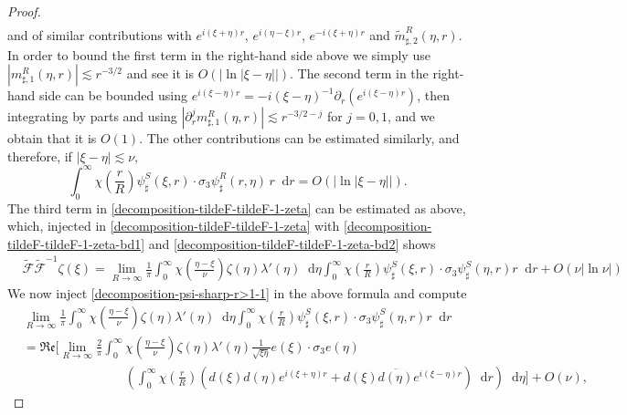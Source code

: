 \documentclass[11 pt]{amsart}
\theoremstyle{definition}
\theoremstyle{remark}
\numberwithin{equation}{section}
\newcommand{\dd}{\mathop{}\!\mathrm{d}}
\begin{document}
\begin{proof}
\begin{align*}
\end{align*}
and of similar contributions with $e^{i(\xi+\eta)r}$, $ e^{i(\eta-\xi)r}$, $e^{-i(\xi+\eta)r}$ and $\widetilde m_{\sharp,2}^R(\eta,r)$. In order to bound the first term in the right-hand side above we simply use $|m_{\sharp,1}^R(\eta,r)|\lesssim r^{-3/2}$ and see it is $O(|\ln |\xi-\eta||)$. The second term in the right-hand side can be bounded using $e^{i(\xi-\eta)r}=-i(\xi-\eta)^{-1}\partial_r (e^{i(\xi-\eta)r})$, then integrating by parts and using $|\partial_r^j m_{\sharp,1}^R(\eta,r)|\lesssim r^{-3/2-j}$ for $j=0,1$, and we obtain that it is $O(1)$. The other contributions can be estimated similarly, and therefore, if $|\xi-\eta|\lesssim \nu$,
\begin{equation} \label{decomposition-tildeF-tildeF-1-zeta-bd2} 
\int_0^\infty \chi \left( \frac{r}{R} \right)  \psi_\sharp^S(\xi,r) \cdot \sigma_3  \psi_\sharp^R(r,\eta)  \,r \dd r =O(|\ln |\xi-\eta||) .
\end{equation}
The third term in \eqref{decomposition-tildeF-tildeF-1-zeta} can be estimated as above, which, injected in \eqref{decomposition-tildeF-tildeF-1-zeta} with \eqref{decomposition-tildeF-tildeF-1-zeta-bd1} and \eqref{decomposition-tildeF-tildeF-1-zeta-bd2} shows
\begin{align} \label{bound-tildeF-tildeF-1-inter1} 
 &\widetilde{\mathcal F} \widetilde{\mathcal F}^{-1} \zeta (\xi)
= \lim_{R \to \infty} \frac{1}{\pi} \int_{0}^\infty \chi (\frac{\eta-\xi}{\nu}) \zeta(\eta)  \lambda'(\eta) \dd \eta \int_0^\infty \chi \left( \frac{r}{R} \right) \psi_\sharp^S (\xi,r) \cdot \sigma_3  \psi_\sharp^S(\eta ,r) r\dd r+O(\nu|\ln \nu|)
\end{align}
We now inject \eqref{decomposition-psi-sharp-r>1-1} in the above formula and compute
\begin{align}  \label{bound-tildeF-tildeF-1-inter2} 
& \lim_{R \to \infty} \frac{1}{\pi} \int_{0}^\infty \chi (\frac{\eta-\xi}{\nu}) \zeta(\eta)  \lambda'(\eta)  \dd \eta \int_0^\infty \chi \left( \frac{r}{R} \right) \psi_\sharp^S (\xi,r) \cdot \sigma_3  \psi_\sharp^S(\eta ,r) r\dd r \\
\nonumber &= \mathfrak{Re} \Bigg[ \lim_{R \to \infty} \frac{2}{\pi} \int_{0}^\infty \chi (\frac{\eta-\xi}{\nu}) \zeta(\eta)  \lambda'(\eta) \frac{1}{\sqrt{\xi \eta}} e(\xi)\cdot \sigma_3 e(\eta) \\
\nonumber & \qquad \qquad \qquad \qquad  \left( \int_0^\infty \chi \left( \frac{r}{R} \right) \left( d(\xi)d(\eta)e^{i(\xi+\eta)r}+d(\xi)\overline{d(\eta)}e^{i(\xi-\eta)r} \right) \dd r \right) \dd \eta  \Bigg]+O(\nu),

\end{align}
\end{proof}
\end{document}
